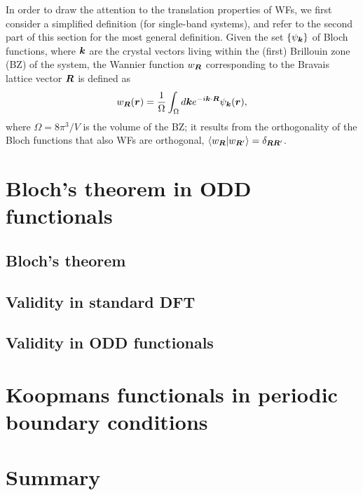 In order to draw the attention to the translation properties of WFs, we first consider a simplified definition (for single-band systems), and refer to the second part of this section for the most general definition. Given the set $\{ \psi_{{\bm k}} \}$ of Bloch functions, where ${\bm k}$ are the crystal vectors living within the (first) Brillouin zone (BZ) of the system, the Wannier function $w_{{\bm R}}$ corresponding to the Bravais lattice vector ${\bm R}$ is defined as
%
\begin{equation}
    w_{{\bm R}}({\bm r}) = \frac{1}{\Omega} \int_{\Omega} d{\bm k} e^{-i{\bm k} \cdot {\bm R}} \psi_{{\bm k}}({\bm r}) ,
    \label{eq:wannier-function-simplified}
\end{equation}
%
where $\Omega = 8\pi^3 / V$ is the volume of the BZ; it results from the orthogonality of the Bloch functions that also WFs are orthogonal, $\braket{w_{{\bm R}} | w_{{\bm R}'}} = \delta_{{\bm R} {\bm R}'}$.


\section{Bloch's theorem in ODD functionals\label{sec:bloch-theorem}}

\subsection{Bloch's theorem\label{sec:bloch-theorem-sub}}

\subsection{Validity in standard DFT\label{bloch-th-dft}}

\subsection{Validity in ODD functionals\label{sec:bloch-th-odd}}

\section{Koopmans functionals in periodic boundary conditions\label{sec:koopmans-pbc}}

\section{Summary\label{sec:ch4-summary}}

